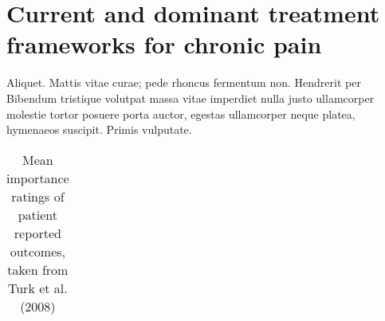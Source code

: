 
\chapter{Current and dominant treatment frameworks for chronic pain}
\label{ch:1-CurrentTreatments}

Aliquet. Mattis vitae curae; pede rhoncus fermentum non. Hendrerit per Bibendum tristique volutpat massa vitae imperdiet nulla justo ullamcorper molestie tortor posuere porta auctor, egestas ullamcorper neque platea, hymenaeos suscipit. Primis vulputate. 

	\begin{table}[ht]
	\centering
	\addtolength{\tabcolsep}{3pt} %
	\begin{scriptsize}
	\caption{Mean importance ratings of patient reported outcomes, taken from  Turk et al. (2008)}
	\label{table:turkOUT}
	\begin{tabular}{m{0.5cm}p{5cm}m{0.5cm}m{1.5cm}m{1.5cm}} 


\end{tabular}
\end{scriptsize}
\end{table}
